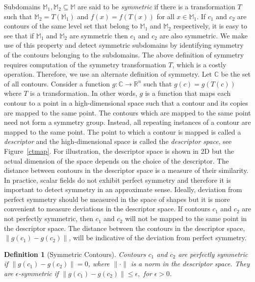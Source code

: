 \documentclass[review,journal]{vgtc}         %
\newtheorem*{defi}{Definition}
\begin{document}
Subdomains $\mathbb{M}_1, \mathbb{M}_2 \subseteq \mathbb{M}$ are said to be \emph{symmetric} 
if there is a transformation $T$ such that ${\mathbb{M}_2=T(\mathbb{M}_1)}$ and 
${f(x)=f(T(x))}$ for all $x \in \mathbb{M}_1$. If $c_1$ and $c_2$ are contours of the same level
set that belong to $\mathbb{M}_1$ and $\mathbb{M}_2$ respectively, it is easy to see that if 
$\mathbb{M}_1$ and $\mathbb{M}_2$ are symmetric then $c_1$ and $c_2$ are also symmetric. 
We make use of this property and detect symmetric subdomains by identifying symmetry of the 
contours belonging to the subdomains. The above definition of symmetry requires computation of the symmetry 
transformation $T$, which is a costly operation. Therefore, we use an alternate definition of symmetry.
Let $\mathbb{C}$ be the set of all contours. 
Consider a function $g : \mathbb{C} \rightarrow \mathbb{R}^n$ such that $g(c) = g(T(c))$
where $T$ is a transformation. In other words, $g$ is a function that maps each
contour to a point in a high-dimensional space such that a contour and its 
copies are mapped to the same point. {\color{blue}The contours which are mapped to the same
point need not form a symmetry group. Instead, all repeating instances of a contour
are mapped to the same point.} The point to which a contour is mapped is called a 
\emph{descriptor} and the high-dimensional space is called the \emph{descriptor space}, see Figure~\ref{ctmap}. 
For illustration, the descriptor space is shown in 2D but the actual dimension of the space
depends on the choice of the descriptor. The distance between contours in the descriptor space is a
measure of their similarity. In practice, scalar fields do not exhibit perfect symmetry and therefore
it is important to detect symmetry in an approximate sense. Ideally, deviation
from perfect symmetry should be measured in the space of shapes but 
it is more convenient to measure deviations in the descriptor space. If contours $c_1$ and 
$c_2$ are not perfectly symmetric, then $c_1$ and $c_2$ will not be mapped
to the same point in the descriptor space. The distance between
the contours in the descriptor space, $\lVert g(c_1)-g(c_2) \rVert$, will be indicative
of the deviation from perfect symmetry. 
\begin{defi}[Symmetric Contours]
Contours $c_1$ and $c_2$ are perfectly symmetric if $\lVert g(c_1)-g(c_2) \rVert = 0$,
where $\lVert \cdot \rVert$ is a norm in the descriptor space. They are 
{$\epsilon$-symmetric} if $\lVert g(c_1)-g(c_2) \rVert \leq \epsilon,$ for $\epsilon > 0$.
\end{defi}
\end{document}
